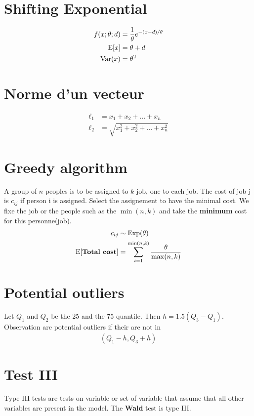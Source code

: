 \documentclass[10pt, french]{article}
\begin{document}
\begin{multicols*}{3}
\section*{Shifting Exponential}
\begin{align*}
   f(x;\theta;d) &= \frac{1}{\theta} e^{-(x-d)/\theta} \\
   \mathrm{E} {\left[ x \right]}&= \theta + d \\
    \mathrm{Var} {\left( x \right)} &= \theta^2    
\end{align*}

\section*{Norme d'un vecteur}
\begin{align*}
   \ell_1 &= x_1 + x_2 + ... + x_n \\
   \ell_2 &= \sqrt{x_1^2 + x_2^2 + ... + x_n^2}
\end{align*}

\section*{Greedy algorithm}
A group of $n$ peoples is to be assigned to $k$ job, one to each job. The cost of job j is $c_{ij}$ if person i is assigned.
Select the assignement to have the minimal cost. We fixe the job or the people such as the $\min(n,k)$ and take the \textbf{minimum} cost for this personne(job).  
\begin{align*}
   c_{ij} &\sim \mathrm{Exp}(\theta) \\
   \mathrm{E} {\left[ \textbf{Total cost} \right]} &= \sum\limits_{i=1}^{\min(n,k)} \frac{\theta}{\max(n,k)}
\end{align*}

\section*{Potential outliers}
Let $Q_1$ and $Q_2$ be the 25 and the 75 quantile. Then $h=1.5(Q_3 - Q_1)$. Observation are
potential outliers if their are not in 
\begin{align*}
  (Q_1 - h, Q_3 + h)  
\end{align*}

\section*{Test III}
Type III tests are tests on variable or set of variable that assume that all other variables are present in the model. 
The \textbf{Wald} test is type III.


\end{multicols*}
\end{document}
